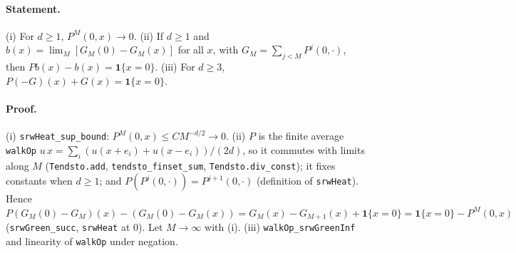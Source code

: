 \paragraph{Statement.} (i) For $d\ge1$, $P^M(0,x)\to0$. (ii) If $d\ge1$ and
$b(x)=\lim_M[G_M(0)-G_M(x)]$ for all $x$, with $G_M=\sum_{j<M}P^j(0,\cdot)$, then
$Pb(x)-b(x)=\mathbf 1\{x=0\}$. (iii) For $d\ge3$, $P(-G)(x)+G(x)=\mathbf1\{x=0\}$.
\paragraph{Proof.} (i) \texttt{srwHeat\_sup\_bound}: $P^M(0,x)\le C M^{-d/2}\to0$. (ii) $P$ is the
finite average \texttt{walkOp} $u\,x=\sum_i(u(x+e_i)+u(x-e_i))/(2d)$, so it commutes with limits
along $M$ (\texttt{Tendsto.add}, \texttt{tendsto\_finset\_sum}, \texttt{Tendsto.div\_const}); it fixes
constants when $d\ge1$; and $P(P^j(0,\cdot))=P^{j+1}(0,\cdot)$ (definition of \texttt{srwHeat}). Hence
$P(G_M(0)-G_M)(x)-(G_M(0)-G_M(x))=G_M(x)-G_{M+1}(x)+\mathbf1\{x=0\}=\mathbf1\{x=0\}-P^M(0,x)$
(\texttt{srwGreen\_succ}, \texttt{srwHeat} at $0$). Let $M\to\infty$ with (i).
(iii) \texttt{walkOp\_srwGreenInf} and linearity of \texttt{walkOp} under negation.

